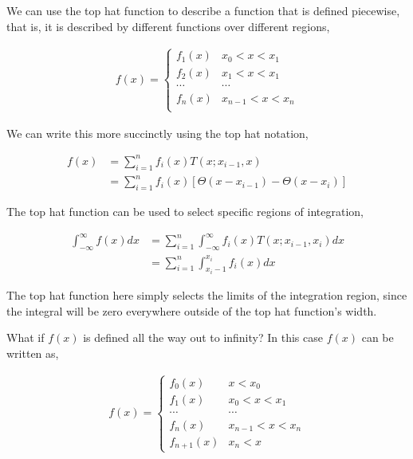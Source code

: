 \documentclass[11pt]{amsart}
\begin{document}
We can use the top hat function to describe a function that is defined piecewise, that is, it is described by different functions over different regions,

\begin{align*}
  f(x) =
  \begin{cases}
    f_1(x) & x_0 < x < x_1 \\
    f_2(x) & x_1 < x < x_1 \\
    \cdots & \cdots \\
    f_n(x) & x_{n-1} < x < x_n \\
  \end{cases}
\end{align*}

We can write this more succinctly using the top hat notation,

\begin{align*}
  f(x) &= \sum\limits_{i = 1}^n f_i(x) T(x; x_{i - 1}, x) \\
       &= \sum\limits_{i = 1}^n f_i(x) \left[\Theta(x - x_{i - 1}) - \Theta(x - x_i)\right]
\end{align*}

The top hat function can be used to select specific regions of integration,

\begin{align*}
  \int_{-\infty}^{\infty} f(x) dx &= \sum\limits_{i = 1}^n \int_{-\infty}^{\infty} f_i(x) T(x; x_{i - 1}, x_i) dx \\
                                  &= \sum\limits_{i = 1}^n \int_{x_i - 1}^{x_i} f_i(x) dx
\end{align*}

The top hat function here simply selects the limits of the integration region, since the integral will be zero everywhere outside of the top hat function's width.

What if $f(x)$ is defined all the way out to infinity? In this case $f(x)$ can be written as,

\begin{align*}
  f(x) =
  \begin{cases}
    f_0(x) & x < x_0 \\
    f_1(x) & x_0 < x < x_1 \\
    \cdots & \cdots \\
    f_n(x) & x_{n-1} < x < x_n \\
    f_{n+1}(x) & x_n < x
  \end{cases}
\end{align*}
\end{document}
